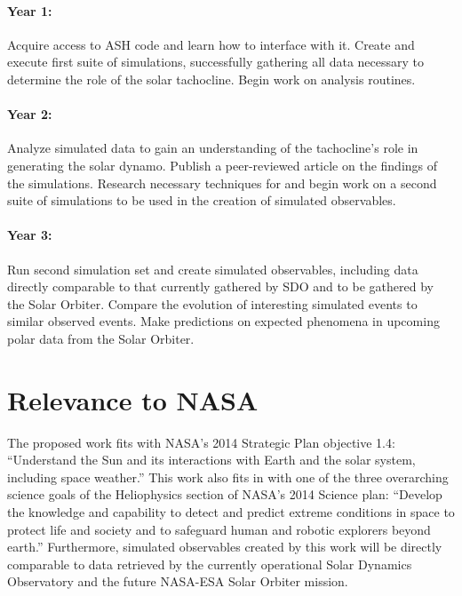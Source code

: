 \documentclass[aasms,12pt]{article}
\begin{document}
\paragraph{Year 1:}
Acquire access to ASH code and learn how to interface with it.
Create and execute first suite of simulations, successfully gathering
all data necessary to determine the role of the solar tachocline.  
Begin work on analysis routines.  
\vspace{-0.5cm}
\paragraph{Year 2:}
Analyze simulated data to gain an understanding of the tachocline's role in
generating the solar dynamo.  Publish a peer-reviewed article on the findings
of the simulations.  Research necessary techniques for and begin work on 
a second suite of simulations to be
used in the creation of simulated observables.  
\vspace{-0.5cm}
\paragraph{Year 3:}
Run second simulation set and create simulated observables, including data
directly comparable to that currently gathered by SDO and to be gathered by the
Solar Orbiter.  Compare the evolution of interesting simulated
events to similar observed events.  Make predictions on expected phenomena in
upcoming polar data from the Solar Orbiter.


\newpage

\section{Relevance to NASA} 
The proposed work fits with NASA's 2014 Strategic Plan objective
1.4:
``Understand the Sun and its interactions with Earth and the solar
system, including space weather.''
This work also fits in with one of the three overarching science goals
of the Heliophysics section of NASA's 2014 Science plan: 
``Develop the
knowledge and capability to detect and predict extreme conditions in space to
protect life and society and to safeguard human and robotic explorers beyond
earth.''  Furthermore, simulated observables created by this work will be
directly comparable to data retrieved by the currently operational Solar
Dynamics Observatory and the future NASA-ESA Solar Orbiter mission.
\end{document}
